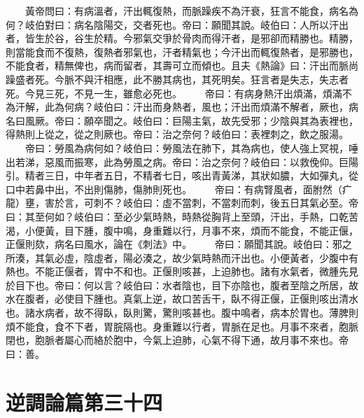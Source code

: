 　　黃帝問曰：有病溫者，汗出輒復熱，而脈躁疾不為汗衰，狂言不能食，病名為何？岐伯對曰：病名陰陽交，交者死也。帝曰：願聞其說。岐伯曰：人所以汗出者，皆生於谷，谷生於精。今邪氣交爭於骨肉而得汗者，是邪卻而精勝也。精勝，則當能食而不復熱，復熱者邪氣也，汗者精氣也；今汗出而輒復熱者，是邪勝也，不能食者，精無俾也，病而留者，其壽可立而傾也。且夫《熱論》曰：汗出而脈尚躁盛者死。今脈不與汗相應，此不勝其病也，其死明矣。狂言者是失志，失志者死。今見三死，不見一生，雖愈必死也。
　　帝曰：有病身熱汗出煩滿，煩滿不為汗解，此為何病？岐伯曰：汗出而身熱者，風也；汗出而煩滿不解者，厥也，病名曰風厥。帝曰：願卒聞之。岐伯曰：巨陽主氣，故先受邪；少陰與其為表裡也，得熱則上從之，從之則厥也。帝曰：治之奈何？岐伯曰：表裡刺之，飲之服湯。
　　帝曰：勞風為病何如？岐伯曰：勞風法在肺下，其為病也，使人強上冥視，唾出若涕，惡風而振寒，此為勞風之病。帝曰：治之奈何？岐伯曰：以救俛仰。巨陽引。精者三日，中年者五日，不精者七日，咳出青黃涕，其狀如膿，大如彈丸，從口中若鼻中出，不出則傷肺，傷肺則死也。
　　帝曰：有病腎風者，面胕然（疒龍）壅，害於言，可刺不？岐伯曰：虛不當刺，不當刺而刺，後五日其氣必至。帝曰：其至何如？岐伯曰：至必少氣時熱，時熱從胸背上至頭，汗出，手熱，口乾苦渴，小便黃，目下腫，腹中鳴，身重難以行，月事不來，煩而不能食，不能正偃，正偃則欬，病名曰風水，論在《刺法》中。
　　帝曰：願聞其說。岐伯曰：邪之所湊，其氣必虛，陰虛者，陽必湊之，故少氣時熱而汗出也。小便黃者，少腹中有熱也。不能正偃者，胃中不和也。正偃則咳甚，上迫肺也。諸有水氣者，微腫先見於目下也。帝曰：何以言？岐伯曰：水者陰也，目下亦陰也，腹者至陰之所居，故水在腹者，必使目下腫也。真氣上逆，故口苦舌干，臥不得正偃，正偃則咳出清水也。諸水病者，故不得臥，臥則驚，驚則咳甚也。腹中鳴者，病本於胃也。薄脾則煩不能食，食不下者，胃脘隔也。身重難以行者，胃脈在足也。月事不來者，胞脈閉也，胞脈者屬心而絡於胞中，今氣上迫肺，心氣不得下通，故月事不來也。帝曰：善。


\section{逆調論篇第三十四}

